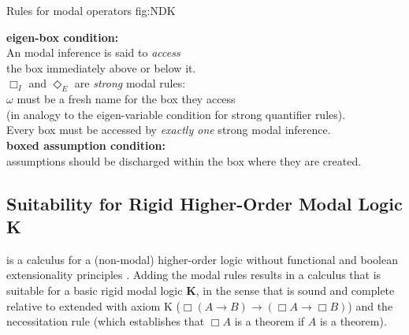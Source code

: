 \documentclass[smallextended]{svjour3}
\newcommand{\imp}{\rightarrow}
\newcommand{\nec}{\Box} %
\newcommand{\pos}{\Diamond} %
\begin{document}
\begin{calculus}
{Rules for modal operators}
{fig:NDK}

\vspace{1em}

\s\s\s\s\s\s
\infer[\nec_I]{\nec A}{\omega: \fbox{\infer*{A}{}} }
\s\s\s\s
\infer[\nec_E]{w: \fbox{ \infer*{}{A} } }{\nec A}

\vspace{2em}

\s\s\s\s\s\s
\infer[\pos_I]{\pos A}{w: \fbox{\infer*{A}{}} }
\s\s\s\s
\infer[\pos_E]{\omega: \fbox{ \infer*{}{A} } }{\pos A}

\vspace{1em}


\begin{center}
\textbf{eigen-box condition:}\\ 
An modal inference is said to \emph{access}\\
 the box immediately above or below it. \\
$\nec_I$ and $\pos_E$ are \emph{strong} modal rules: \\
$\omega$ must be a fresh name for the box they access \\ 
(in analogy to the eigen-variable condition for strong quantifier rules). \\
Every box must be accessed by \emph{exactly one} strong modal inference. \\
\vspace{0.5em}
\textbf{boxed assumption condition:} \\
assumptions should be discharged within the box where they are created.
\end{center}

\vspace{1em}

\end{calculus}


\subsection{Suitability for Rigid Higher-Order Modal Logic K}\label{sec:compl-sound}

{\ND} is a calculus for a (non-modal) higher-order logic without 
functional and boolean extensionality principles \citep{BenzmuellerBrownKohlhase}.
Adding the modal rules results in a calculus that is suitable for a basic rigid modal logic \textbf{K}, in the sense that {\NDK} is sound and complete relative to {\ND} extended with axiom K ($\nec(A\imp B)\imp (\nec A\imp \nec B)$) and the necessitation rule (which establishes that $\nec A$ is a theorem if $A$ is a theorem).
\end{document}
